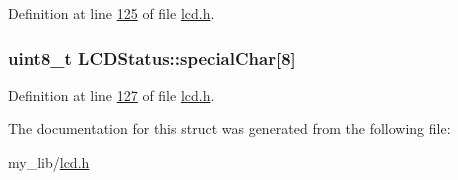 Definition at line \hyperlink{lcd_8h_source_l00125}{125} of file \hyperlink{lcd_8h_source}{lcd.\-h}.

\hypertarget{struct_l_c_d_status_a8a1571d6288e2ec1ed1114fca2f873be}{
\subsubsection[{special\-Char}]{\setlength{\rightskip}{0pt plus 5cm}uint8\-\_\-t L\-C\-D\-Status\-::special\-Char\mbox{[}8\mbox{]}}}\label{struct_l_c_d_status_a8a1571d6288e2ec1ed1114fca2f873be}


Definition at line \hyperlink{lcd_8h_source_l00127}{127} of file \hyperlink{lcd_8h_source}{lcd.\-h}.



The documentation for this struct was generated from the following file\-:\begin{DoxyCompactItemize}
\item 
my\-\_\-lib/\hyperlink{lcd_8h}{lcd.\-h}\end{DoxyCompactItemize}
